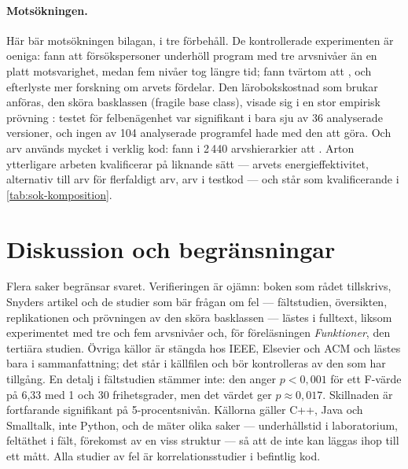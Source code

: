 \paragraph{Motsökningen.}  Här bär motsökningen bilagan, i tre
förbehåll.  De kontrollerade experimenten är oeniga: \textcite{Daly1996}
fann att försökspersoner underhöll program med tre arvsnivåer
 än en platt motsvarighet,
medan fem nivåer tog längre tid; \textcite{Harrison2000} fann tvärtom
att , och efterlyste mer forskning om arvets
fördelar.  Den lärobokskostnad som brukar anföras, den sköra basklassen
(\foreignlanguage{english}{fragile base class}), visade sig i en stor
empirisk prövning
: testet för felbenägenhet var signifikant i bara sju av
36 analyserade versioner\autocite[2639]{Sabane2017}, och ingen av 104
analyserade programfel hade med den att göra.  Och arv används mycket i
verklig kod: \textcite{StevensonWood2018} fann i 2\,440 arvshierarkier att
.  Arton ytterligare arbeten kvalificerar på liknande sätt
--- arvets energieffektivitet, alternativ till arv för flerfaldigt arv,
arv i testkod --- och står som kvalificerande i
\cref{tab:sok-komposition}.

\section{Diskussion och begränsningar}
\label{sec:komp-diskussion}

Flera saker begränsar svaret.  Verifieringen är ojämn: boken som rådet
tillskrivs, Snyders artikel och de studier som bär frågan om fel ---
fältstudien, översikten, replikationen och prövningen av den sköra
basklassen\autocite{CartwrightShepperd2000,Jabangwe2015SLR,%
Counsell2021WhereBugs,Sabane2017} --- lästes i fulltext, liksom
experimentet med tre och fem arvsnivåer\autocite{Daly1996} och, för
föreläsningen \emph{Funktioner}, den tertiära
studien\autocite{Iftikhar2024Tertiary}.  Övriga källor är stängda hos
IEEE, Elsevier och ACM och lästes bara i
sammanfattning\autocite{WildeHuitt1992,Harrison2000,StevensonWood2018,%
Briand2000Exploring,ElEmam2001Confounding,Evanco2003Comments}; det
står i källfilen och bör kontrolleras av den som har tillgång.  En
detalj i fältstudien stämmer inte: den anger $p<0{,}001$ för ett
F-värde på 6,33 med 1 och 30 frihetsgrader, men det värdet ger
$p \approx 0{,}017$.  Skillnaden är fortfarande signifikant på
5-procentsnivån.  Källorna gäller C++, Java och Smalltalk, inte Python,
och de mäter olika saker --- underhållstid i laboratorium, feltäthet i
fält, förekomst av en viss struktur --- så att de inte kan läggas ihop
till ett mått.  Alla studier av fel är korrelationsstudier i befintlig
kod.

